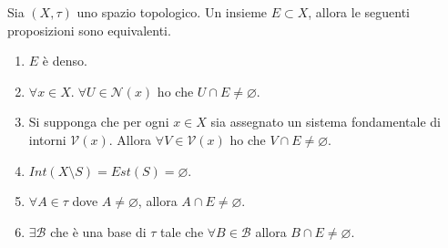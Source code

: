 \begin{theorem}
	\label{thr:dense_set_iff}
	Sia $(X,\tau)$ uno spazio topologico. Un insieme $E \subset X$, allora le seguenti proposizioni sono equivalenti.
	\begin{enumerate}
		\item $E$ è denso.
		\item $\forall x \in X . \; \forall U \in \mathcal{N}(x)$ ho che $U \cap E \neq \varnothing$.
		\item Si supponga che per ogni $x \in X$ sia assegnato un sistema fondamentale di intorni $\mathcal{V}(x)$. Allora $\forall V \in \mathcal{V}(x)$ ho che $V \cap E \neq \varnothing$.
		\item $Int(X \setminus S) = Est(S) = \varnothing$.
		\item $\forall A \in \tau$ dove $A \neq \varnothing$, allora $A \cap E \neq \varnothing$.
		\item $\exists \mathcal{B}$ che è una base di $\tau$ tale che $\forall B \in \mathcal{B}$ allora $B \cap E \neq \varnothing$.
	\end{enumerate}
\end{theorem}
